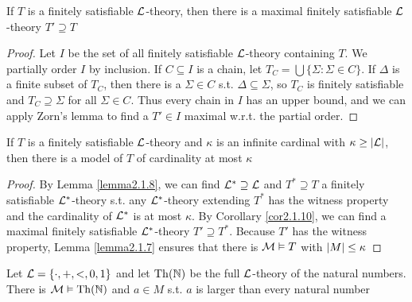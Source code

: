 \documentclass[11pt]{article}
\begin{document}
\begin{corollary}[]
\label{cor2.1.10}
If \(T\) is a finitely satisfiable \(\mathcal{L}\)-theory, then there is a maximal
finitely satisfiable \(\mathcal{L}\)-theory \(T'\supseteq T\)
\end{corollary}
\begin{proof}
Let \(I\) be the set of all finitely satisfiable \(\mathcal{L}\)-theory containing
\(T\). We partially order \(I\) by inclusion. If \(C\subseteq I\) is a chain, let
\(T_C=\bigcup\{\Sigma:\Sigma\in C\}\). If \(\Delta\) is a finite subset of
\(T_C\), then there is a \(\Sigma\in C\) s.t. \(\Delta\subseteq\Sigma\), so \(T_C\)
is finitely satisfiable and \(T_C\supseteq\Sigma\) for all \(\Sigma\in C\). Thus
every chain in \(I\) has an upper bound, and we can apply Zorn's lemma to find
a \(T'\in I\) maximal w.r.t. the partial order.
\end{proof}


\begin{theorem}
\label{thm2.1.11}
If \(T\) is a finitely satisfiable \(\mathcal{L}\)-theory and \(\kappa\) is an infinite
cardinal with \(\kappa\ge\abs{\call}\), then there is a model of \(T\) of
cardinality at most \(\kappa\)
\end{theorem}

\begin{proof}
By Lemma \ref{lemma2.1.8}, we can find \(\mathcal{L}^*\supseteq\mathcal{L}\) and 
\(T^*\supseteq T\) a finitely satisfiable \(\mathcal{L}^*\)-theory s.t. any
\(\mathcal{L}^*\)-theory extending \(T^*\) has the witness property and the
cardinality of \(\mathcal{L}^*\) is at most \(\kappa\). By Corollary \ref{cor2.1.10}, we can
find a maximal finitely satisfiable \(\mathcal{L}^*\)-theory 
\(T'\supseteq T^*\). Because \(T'\) has the witness property, Lemma
\ref{lemma2.1.7} ensures that there is \(\mathcal{M}\vDash T\) with \(\abs{M}\le\kappa\)
\end{proof}

\begin{proposition}[]
Let \(\mathcal{L}=\{\cdot,+,<,0,1\}\) and let \(\operatorname{Th}(\mathbb{N})\) be the full \(\mathcal{L}\)-theory
of the natural numbers. There is \(\mathcal{M}\vDash\operatorname{Th}(\mathbb{N})\) and \(a\in M\) s.t. \(a\)
is larger than every natural number
\end{proposition}
\end{document}
